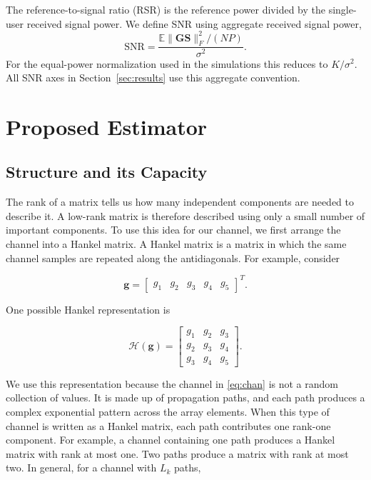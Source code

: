\documentclass[journal]{IEEEtran}
\newcommand{\bG}{\mathbf{G}}
\newcommand{\bS}{\mathbf{S}}
\newcommand{\bg}{\mathbf{g}}
\newcommand{\Hank}{\mathcal{H}}
\begin{document}
The reference-to-signal ratio (RSR) is the reference power divided by the
single-user received signal power. We define SNR using aggregate received
signal power,
\begin{equation}
\mathrm{SNR}=\frac{\mathbb{E}\|\bG\bS\|_F^2/(NP)}{\sigma^2}.
\end{equation}
For the equal-power normalization used in the simulations this reduces to
$K/\sigma^2$. All SNR axes in Section~\ref{sec:results} use this aggregate
convention.


\section{Proposed Estimator}
\label{sec:method}

\subsection{Structure and its Capacity}

The rank of a matrix tells us how many independent components are needed
to describe it. A low-rank matrix is therefore described using only a
small number of important components. To use this idea for our channel,
we first arrange the channel into a Hankel matrix. A Hankel matrix is a
matrix in which the same channel samples are repeated along the
antidiagonals. For example, consider

\begin{equation}
\bg=
\begin{bmatrix}
g_1 & g_2 & g_3 & g_4 & g_5
\end{bmatrix}^{T}.
\end{equation}

One possible Hankel representation is

\begin{equation}
\Hank(\bg)
=
\begin{bmatrix}
g_1 & g_2 & g_3\\
g_2 & g_3 & g_4\\
g_3 & g_4 & g_5
\end{bmatrix}.
\end{equation}

We use this representation because the channel in \eqref{eq:chan} is not
a random collection of values. It is made up of propagation paths, and
each path produces a complex exponential pattern across the array elements.
When this type of channel is written as a Hankel matrix, each path
contributes one rank-one component. For example, a channel containing one
path produces a Hankel matrix with rank at most one. Two paths produce a
matrix with rank at most two. In general, for a channel with $L_k$ paths,
\end{document}
